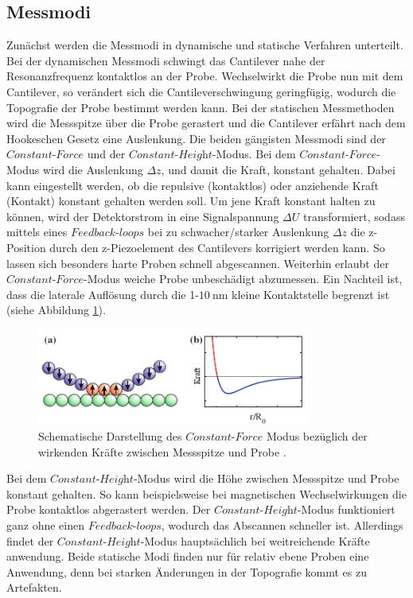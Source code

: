 \subsection{Messmodi}
\label{sec:Messmodi}
Zunächst werden die Messmodi in dynamische und statische Verfahren unterteilt.
Bei der dynamischen Messmodi schwingt das Cantilever nahe der Resonanzfrequenz
kontaktlos an der Probe. Wechselwirkt die Probe nun mit dem Cantilever, so verändert
sich die Cantileverschwingung geringfügig, wodurch die Topografie der Probe bestimmt
werden kann.
Bei der statischen Messmethoden wird die Messspitze über die Probe gerastert und
die Cantilever erfährt nach dem Hookeschen Gesetz eine Auslenkung. Die beiden
gängisten Messmodi sind der $\textit{Constant-Force}$ und der
$\textit{Constant-Height}$-Modus. Bei dem $\textit{Constant-Force}$-Modus wird
die Auslenkung $\Delta z$, und damit die Kraft, konstant gehalten. Dabei kann
eingestellt werden, ob die repulsive (kontaktlos) oder anziehende Kraft (Kontakt)
konstant gehalten werden soll. Um jene Kraft konstant halten zu können, wird der
Detektorstrom in eine Signalspannung $\Delta U$ transformiert, sodass mittels
eines $\textit{Feedback-loops}$ bei zu schwacher/starker Auslenkung $\Delta z$
die z-Position durch den z-Piezoelement des Cantilevers korrigiert werden kann.
So lassen sich besonders harte Proben schnell abgescannen. Weiterhin erlaubt der
$\textit{Constant-Force}$-Modus weiche Probe unbeschädigt abzumessen. Ein Nachteil
ist, dass die laterale Auflösung durch die 1-$\SI{10}{\nano\meter}$ kleine
Kontaktstelle begrenzt ist (siehe Abbildung \ref{fig:const-force}).

\begin{figure}[H]
	\centering
	\includegraphics[width=0.8\textwidth]{Abb/const-force.png}
	\caption{Schematische Darstellung des $\textit{Constant-Force}$ Modus bezüglich
	der wirkenden Kräfte zwischen Messspitze und Probe \cite[179]{AFM}.}
	\label{fig:const-force}
\end{figure}

\noindent
Bei dem
$\textit{Constant-Height}$-Modus wird die Höhe zwischen Messspitze und Probe
konstant gehalten. So kann beispielsweise bei magnetischen Wechselwirkungen die
Probe kontaktlos abgerastert werden. Der $\textit{Constant-Height}$-Modus funktioniert
ganz ohne einen $\textit{Feedback-loops}$, wodurch das Abscannen schneller ist.
Allerdings findet der $\textit{Constant-Height}$-Modus hauptsächlich bei weitreichende
Kräfte anwendung. Beide statische Modi finden nur für relativ ebene Proben eine
Anwendung, denn bei starken Änderungen in der Topografie kommt es zu Artefakten.


